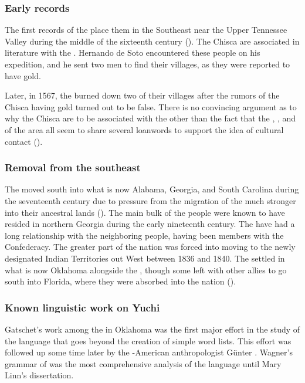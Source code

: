\documentclass[output=paper]{LSP/langsci}
\begin{document}
\subsubsection{Early records} 

The first records of the  place them in the Southeast near the Upper Tennessee Valley during the middle of the sixteenth century (\citealt{Gatschet1885}). The Chisca are associated in literature with the . Hernando de Soto encountered these people on his expedition, and he sent two men to find their villages, as they were reported to have gold. 

Later, in 1567, the  burned down two of their villages after the rumors of the Chisca having gold turned out to be false. There is no convincing argument as to why the Chisca are to be associated with the  other than the fact that the , , and  of the area all seem to share several loanwords to support the idea of cultural contact (\citet{BookerEtAl1992}).

\subsubsection{Removal from the southeast} 

The  moved south into what is now Alabama, Georgia, and South Carolina during the seventeenth century due to pressure from the migration of the much stronger  into their ancestral lands (\citealt{Jackson2012}). The main bulk of the  people were known to have resided in northern Georgia during the early nineteenth century. The  have had a long relationship with the neighboring  people, having been members with the  Confederacy. The greater part of the  nation was forced into moving to the newly designated Indian Territories out West between 1836 and 1840. The  settled in what is now Oklahoma alongside the , though some  left with other  allies to go south into Florida, where they were absorbed into the  nation (\citealt{Mithun1999}).

\subsubsection{Known linguistic work on Yuchi} 

Gatschet's \citeyear{Gatschet1885} work among the  in Oklahoma was the first major effort in the study of the  language that goes beyond the creation of simple word lists. This effort was followed up some time later by the -American anthropologist G\"unter \citet{Wagner1934}. Wagner's  grammar of  was the most comprehensive analysis of the language until Mary Linn's \citeyear{Linn2000} dissertation.
\end{document}
